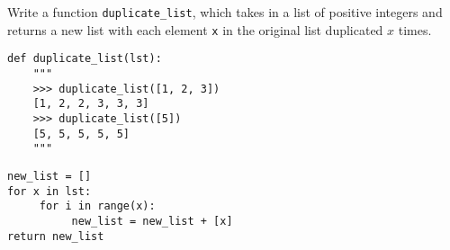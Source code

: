 \begin{blocksection}
\question Write a function \lstinline$duplicate_list$, which takes in a list of positive integers and returns a new list with each element \lstinline$x$ in the original list duplicated $x$ times.

\begin{lstlisting}
def duplicate_list(lst):
    """
    >>> duplicate_list([1, 2, 3])
    [1, 2, 2, 3, 3, 3]
    >>> duplicate_list([5])
    [5, 5, 5, 5, 5]
    """
\end{lstlisting}

\begin{solution}
\begin{lstlisting}
new_list = []
for x in lst:
     for i in range(x):
          new_list = new_list + [x]
return new_list
\end{lstlisting}
\end{solution}
\end{blocksection}

